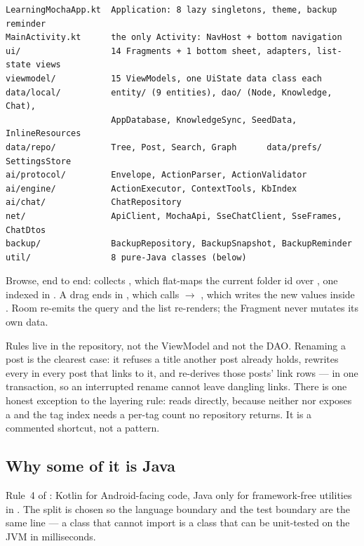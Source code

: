 \begin{lstlisting}[caption={Package layout under app/src/main/java/com/cs426/learningmocha/}]
LearningMochaApp.kt  Application: 8 lazy singletons, theme, backup reminder
MainActivity.kt      the only Activity: NavHost + bottom navigation
ui/                  14 Fragments + 1 bottom sheet, adapters, list-state views
viewmodel/           15 ViewModels, one UiState data class each
data/local/          entity/ (9 entities), dao/ (Node, Knowledge, Chat),
                     AppDatabase, KnowledgeSync, SeedData, InlineResources
data/repo/           Tree, Post, Search, Graph      data/prefs/ SettingsStore
ai/protocol/         Envelope, ActionParser, ActionValidator
ai/engine/           ActionExecutor, ContextTools, KbIndex
ai/chat/             ChatRepository
net/                 ApiClient, MochaApi, SseChatClient, SseFrames, ChatDtos
backup/              BackupRepository, BackupSnapshot, BackupReminder
util/                8 pure-Java classes (below)
\end{lstlisting}

Browse, end to end:  collects , which flat-maps
the current folder id over , one indexed
 in . A drag ends in , which calls
 $\rightarrow$ , which writes the new
 values inside . Room re-emits the query and the list
re-renders; the Fragment never mutates its own data.

Rules live in the repository, not the ViewModel and not the DAO. Renaming a post is the clearest
case: it refuses a title another post already holds, rewrites every  in every
post that links to it, and re-derives those posts' link rows --- in one transaction, so an
interrupted rename cannot leave dangling links. There is one honest exception to the layering rule:
 reads  directly, because neither  nor
 exposes a  and the tag index needs a per-tag count no repository
returns. It is a commented shortcut, not a pattern.

\subsection{Why some of it is Java}

Rule~4 of : Kotlin for Android-facing code, Java only for framework-free utilities in
. The split is chosen so the language boundary and the test boundary are the same line
--- a class that cannot import  is a class that can be unit-tested on the JVM in
milliseconds.

